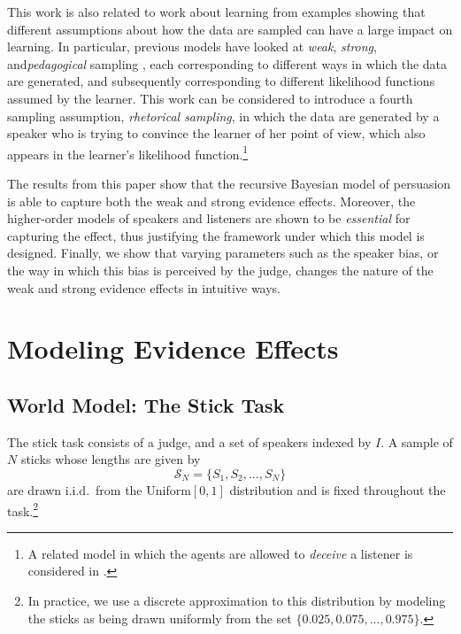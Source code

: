 \documentclass[10pt,letterpaper]{article}
\begin{document}
This work is also related to work about learning from examples showing that different assumptions
about how the data are sampled can have a large impact on learning. In particular, previous models have 
looked at \textit{weak}, \textit{strong}, and\textit{pedagogical} sampling 
\cite{hsu2009differential, shafto_rational_2014, tenenbaum1999bayesian, tenenbaum2001generalization}, each corresponding to different ways
in which the data are generated, and subsequently corresponding to different likelihood functions assumed by
the learner. This work can be considered to introduce a fourth sampling assumption, \textit{rhetorical sampling},
in which the data are generated by a speaker who is trying to convince the learner of her point of view, which
also appears in the learner's likelihood function.\footnote{A related model in which the agents are allowed to \textit{deceive}
a listener is considered in .	}

The results from this paper show that the recursive Bayesian model of persuasion is able to capture both the
weak and strong evidence effects. Moreover, the higher-order models of speakers and listeners are shown to
be \textit{essential} for capturing the effect, thus justifying the framework under which this model is designed. 
Finally, we show that varying parameters such as the speaker bias, or the way in which this bias is perceived by
the judge, changes the nature of the weak and strong evidence effects in intuitive ways.

\section{Modeling Evidence Effects}
\subsection{World Model: The Stick Task}
The stick task consists of a judge, and a set of speakers indexed by $I$. 
A sample of $N$ sticks whose lengths are given by
\begin{equation}
\mathcal{S}_N = \{ S_1, S_2, ..., S_N \}
\end{equation}
are drawn i.i.d.\ from the Uniform$[0,1]$ distribution and is fixed throughout
the task.\footnote{In practice, we use a discrete approximation to this distribution 
by modeling the sticks as being drawn uniformly from the set $\{ 0.025, 0.075, ..., 0.975\}$.} 
\end{document}
